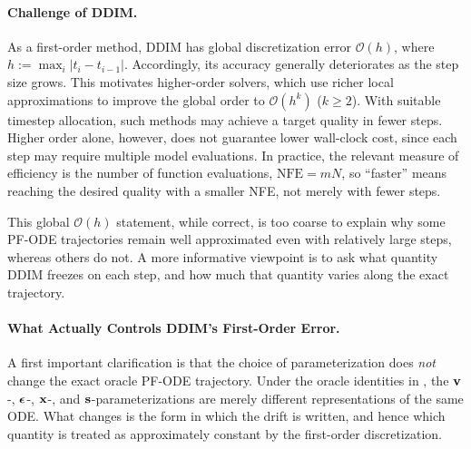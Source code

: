 \paragraph{Challenge of DDIM.}
As a first-order method, DDIM has global discretization error
$\mathcal O(h)$, where $h:=\max_i |t_i-t_{i-1}|$. Accordingly, its
accuracy generally deteriorates as the step size grows. This motivates
higher-order solvers, which use richer local approximations to improve
the global order to $\mathcal O(h^k)$ ($k\ge 2$). With suitable
timestep allocation, such methods may achieve a target quality in fewer
steps. Higher order alone, however, does not guarantee lower wall-clock
cost, since each step may require multiple model evaluations. In
practice, the relevant measure of efficiency is the number of function
evaluations, $\mathrm{NFE}=mN$, so ``faster'' means reaching the desired
quality with a smaller NFE, not merely with fewer steps.

This global $\mathcal O(h)$ statement, while correct, is too coarse to
explain why some PF-ODE trajectories remain well approximated even with
relatively large steps, whereas others do not. A more informative
viewpoint is to ask what quantity DDIM freezes on each step, and how
much that quantity varies along the exact trajectory.

\paragraph{What Actually Controls DDIM's First-Order Error.}
A first important clarification is that the choice of parameterization
does \emph{not} change the exact oracle PF-ODE trajectory. Under the
oracle identities in , the
${\mathbf{v}}$-, ${\bm{\epsilon}}$-, ${\mathbf{x}}$-, and ${\mathbf{s}}$-parameterizations are merely
different representations of the same ODE. What changes is the form in
which the drift is written, and hence which quantity is treated as
approximately constant by the first-order discretization.

